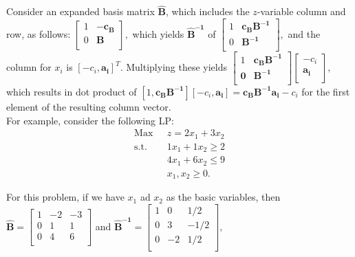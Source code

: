 Consider an expanded basis matrix $\mathbf{\hat{B}}$, which includes the $z$-variable column and row, as follows: $\left[ \begin{array}{cc}
    1 & -\mathbf{c_B} \\
    0 & \mathbf{B} \\
\end{array} \right],$
which yields $\mathbf{\hat{B}^{-1}}$ of $\left[ \begin{array}{cc}
    1 & \mathbf{c_BB^{-1}} \\
    0 & \mathbf{B^{-1}} \\
\end{array} \right],$
and the column for $x_i$ is $[-c_i, \mathbf{a_i}]^T$.  Multiplying these yields $\left[
\begin{array}{cc}
 1         & \mathbf{c_BB^{-1}} \\
\mathbf{0} & \mathbf{B^{-1}} \\
\end{array} \right] \left[
\begin{array}{c}
     -c_i \\
     \mathbf{a_i} \\
\end{array} \right],$
which results in dot product of  $[1,\mathbf{c_BB^{-1}}][-c_i, \mathbf{a_i}] = \mathbf{c_BB^{-1}a_i} - c_i$ for the first element of the resulting column vector. \\

\vspace{5mm} For example, consider the following LP:
\begin{align*}
\mbox{Max~~} & z = 2x_1 + 3x_2  \\
\mbox{s.t.~~}  & 1x_1 + 1x_2 \ge 2 \\
&      4x_1 + 6x_2 \le 9 \\
&      x_1, x_2 \ge 0. 
\end{align*}

For this problem, if we have $x_1$ ad $x_2$ as the basic variables, then \\

$\mathbf{\hat{B}} = \left[ \begin{array}{ccc}
    1 & -2 & -3 \\
    0 &  1 &  1 \\
    0 &  4 &  6 \\
\end{array} \right]$
and $\mathbf{\hat{B}^{-1}} = \left[ \begin{array}{ccc}
    1 &  0  & 1/2   \\
    0 &  3  &  -1/2 \\
    0 &  -2 &  1/2 \\
\end{array} \right],$ \\

